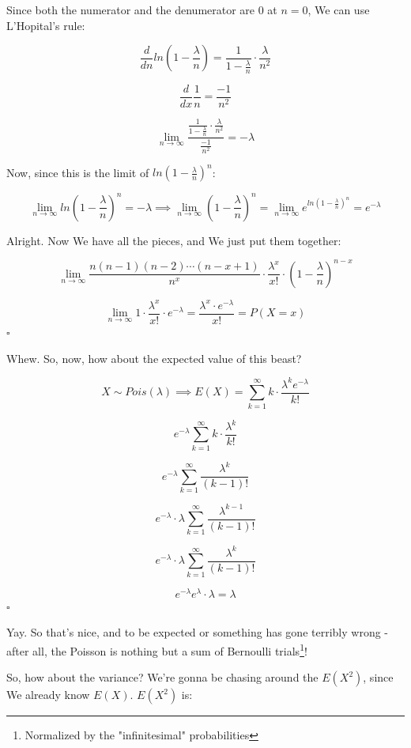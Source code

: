 \documentclass{article}
\newcommand{\qed}{\hfill$\square$}
\begin{document}
		Since both the numerator and the denumerator are 0 at $n = 0$, We can use L'Hopital's rule:
		
		\[ \frac{d}{dn} ln\left( 1 - \frac{ \lambda}{n}\right) = \frac{1}{ 1 - \frac{ \lambda}{n}} \cdot \frac{\lambda }{n^2}  \]
		
		\[ \frac{d}{dx} \frac{1}{n} = \frac{-1}{n^2}\]
		
		\[ \lim_{n \to \infty} \frac{\frac{1}{ 1 - \frac{ \lambda}{n}} \cdot \frac{\lambda }{n^2}}{\frac{-1}{n^2}}  = -\lambda\]
		
		Now, since this is the limit of $ln\left(1 - \frac{\lambda}{n}\right)^n$:
		
		\[\lim_{n\to\infty} ln\left(1 - \frac{\lambda}{n}\right)^n = -\lambda \implies \lim_{n\to\infty} \left(1 - \frac{\lambda}{n}\right)^n = \lim_{n\to\infty} e^{ln\left(1 - \frac{\lambda}{n}\right)^n} = e^{-\lambda}\]

		Alright. Now We have all the pieces, and We just put them together:
		
		
		\[\lim_{n \to \infty} \frac{n(n-1)(n-2)\cdots(n-x+1)}{n^x}  \cdot \frac{\lambda^x}{x!}\cdot  \left(1 - \frac{\lambda}{n}\right)^{n-x} \]
		
		\[\lim_{n\to\infty} 1 \cdot  \frac{\lambda^x}{x!} \cdot e^{-\lambda} = \frac{\lambda^x\cdot e^{-\lambda}}{x!} = P(X = x)  \]\qed 		
		
		Whew. So, now, how about the expected value of this beast?
		
		\[ X \sim Pois(\lambda) \implies E(X) = \sum^\infty_{k=1}k\cdot\frac{\lambda^ke^{-\lambda}}{k!} \]
		
		\[e^{-\lambda}\sum^\infty_{k=1}k\cdot\frac{\lambda^k}{k!} \]
		
		\[e^{-\lambda}\sum^\infty_{k=1}\frac{\lambda^k}{(k-1)!}\]
		
		\[e^{-\lambda}\cdot\lambda \sum^\infty_{k=1}\frac{\lambda^{k-1}}{(k-1)!}\]
		
		\[e^{-\lambda}\cdot\lambda \sum^\infty_{k=1}\frac{\lambda^k}{(k-1)!}\]
		
		\[e^{-\lambda} e^\lambda\cdot\lambda = \lambda\]\qed
		
		Yay. So that's nice, and to be expected or something has gone terribly wrong - after all, the Poisson is nothing but a sum of Bernoulli trials\footnote{Normalized by the "infinitesimal" probabilities}!
		
		So, how about the variance? We're gonna be chasing around the $E(X^2)$, since We already know $E(X)$. $E(X^2)$ is:
		
\end{document}
